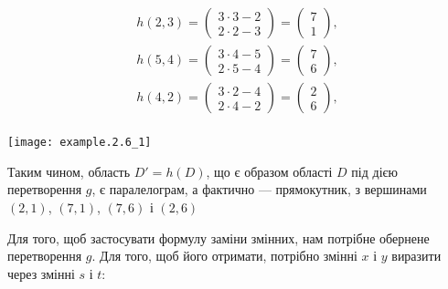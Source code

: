 \begin{example}
\[\begin{array}{c}
 h\left(2,3\right) = \left(\begin{array}{c}3\cdot3 - 2\\2\cdot 2 - 3\end{array}\right) = \left(\begin{array}{c}7\\1\end{array}\right),\\
 h\left(5,4\right) = \left(\begin{array}{c}3\cdot4 - 5\\2\cdot 5 - 4\end{array}\right) = \left(\begin{array}{c}7\\6\end{array}\right),\\
 h\left(4,2\right) = \left(\begin{array}{c}3\cdot2 - 4\\2\cdot 4 - 2\end{array}\right) = \left(\begin{array}{c}2\\6\end{array}\right),\\
 \end{array}
 \]

\texttt{[image: example.2.6\_1]}

Таким чином, область ${D' = h\left(D\right)}$, що є образом області $D$ під дією перетворення $g$, є паралелограм, а фактично --- прямокутник, з вершинами $\left(2,1\right)$, $\left(7,1\right)$, $\left(7,6\right)$ і $\left(2,6\right)$

Для того, щоб застосувати формулу заміни змінних, нам потрібне обернене перетворення $g$. Для того, щоб його отримати, потрібно змінні $x$ і $y$ виразити через змінні $s$ і $t$:


\end{example}
